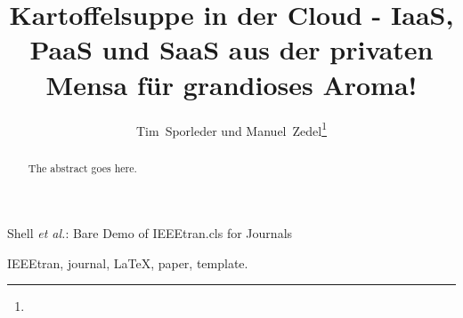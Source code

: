\documentclass[journal]{IEEEtran}
\begin{document}
\title{Kartoffelsuppe in der Cloud - IaaS, PaaS und SaaS aus der privaten Mensa für grandioses Aroma!}

\author{Tim~Sporleder und Manuel~Zedel\thanks{}}

%
{Shell \MakeLowercase{\textit{et al.}}: Bare Demo of IEEEtran.cls for Journals}
% 











\maketitle

\begin{abstract}
The abstract goes here.
\end{abstract}

\begin{IEEEkeywords}
IEEEtran, journal, \LaTeX, paper, template.
\end{IEEEkeywords}






%
\IEEEpeerreviewmaketitle
\end{document}

